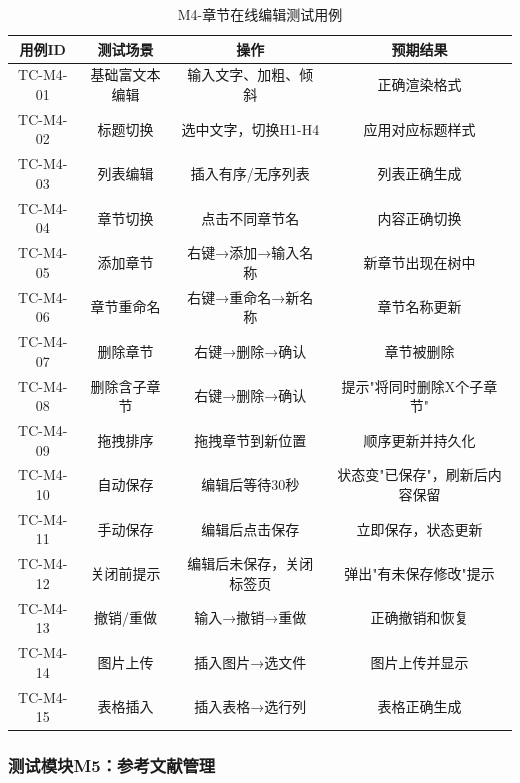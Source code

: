 \begin{table}[htbp]
    \centering
    \caption{M4-章节在线编辑测试用例}
    \begin{tabular}{|c|c|c|c|}
        \hline
        \textbf{用例ID} & \textbf{测试场景} & \textbf{操作} & \textbf{预期结果} \\
        \hline
        TC-M4-01 & 基础富文本编辑 & 输入文字、加粗、倾斜 & 正确渲染格式 \\
        \hline
        TC-M4-02 & 标题切换 & 选中文字，切换H1-H4 & 应用对应标题样式 \\
        \hline
        TC-M4-03 & 列表编辑 & 插入有序/无序列表 & 列表正确生成 \\
        \hline
        TC-M4-04 & 章节切换 & 点击不同章节名 & 内容正确切换 \\
        \hline
        TC-M4-05 & 添加章节 & 右键→添加→输入名称 & 新章节出现在树中 \\
        \hline
        TC-M4-06 & 章节重命名 & 右键→重命名→新名称 & 章节名称更新 \\
        \hline
        TC-M4-07 & 删除章节 & 右键→删除→确认 & 章节被删除 \\
        \hline
        TC-M4-08 & 删除含子章节 & 右键→删除→确认 & 提示"将同时删除X个子章节" \\
        \hline
        TC-M4-09 & 拖拽排序 & 拖拽章节到新位置 & 顺序更新并持久化 \\
        \hline
        TC-M4-10 & 自动保存 & 编辑后等待30秒 & 状态变"已保存"，刷新后内容保留 \\
        \hline
        TC-M4-11 & 手动保存 & 编辑后点击保存 & 立即保存，状态更新 \\
        \hline
        TC-M4-12 & 关闭前提示 & 编辑后未保存，关闭标签页 & 弹出"有未保存修改"提示 \\
        \hline
        TC-M4-13 & 撤销/重做 & 输入→撤销→重做 & 正确撤销和恢复 \\
        \hline
        TC-M4-14 & 图片上传 & 插入图片→选文件 & 图片上传并显示 \\
        \hline
        TC-M4-15 & 表格插入 & 插入表格→选行列 & 表格正确生成 \\
        \hline
    \end{tabular}
\end{table}

\subsubsection{测试模块M5：参考文献管理}

